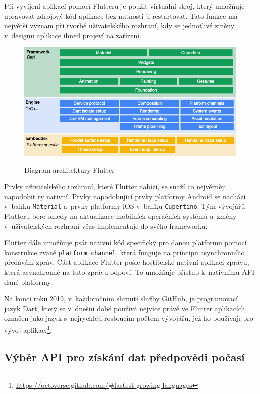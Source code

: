 \documentclass[12pt, a4paper]{article}
\begin{document}
Při vyvíjení aplikací pomocí Flutteru je použit virtuální stroj, který umožňuje upravovat zdrojový kód aplikace bez nutnosti ji restartovat. Tato funkce má největší význam při tvorbě uživatelského rozhraní, kdy se jednotlivé změny v~designu aplikace ihned projeví na zařízení. 

\begin{figure}[!ht]
\centering
{\includegraphics[width=13.5cm]{img/flutter-architecture.png}}
\caption{Diagram architektury Flutter}
\label{fig:flutter-architecture}
\end{figure}

Prvky uživatelského rozhraní, které Flutter nabízí, se snaží co nejvěrněji napodobit ty nativní. Prvky napodobující prvky platformy Android se nachází v~balíku \texttt{Material} a~prvky platformy iOS v~balíku \texttt{Cupertino}. Tým vývojářů Flutteru bere ohledy na aktualizace mobilních operačních systémů a~změny v~uživatelských rozhraní včas implementuje do svého frameworku.

Flutter dále umožňuje psát nativní kód specifický pro danou platformu pomocí konstrukce zvané \texttt{platform channel}, která funguje na principu asynchronního předávání zpráv. Část aplikace Flutter pošle hostitelské nativní aplikaci zprávu, která asynchronně na tuto zprávu odpoví. To umožňuje přístup k~nativnímu API dané platformy. 

Na konci roku 2019, v~každoročním shrnutí služby GitHub, je programovací jazyk Dart, který se v~dnešní době používá nejvíce právě ve Flutter aplikacích, označen jako jazyk s~nejrychleji rostoucím počtem vývojářů, jež ho používají pro vývoj aplikací\footnote{\url{https://octoverse.github.com/#fastest-growing-languages}}.


\subsection{Výběr API pro získání dat předpovědi počasí}
\end{document}
